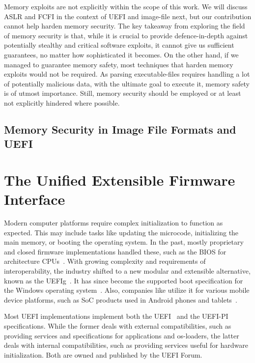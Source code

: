 Memory exploits are not explicitly within the scope of this work. We will discuss \gls{ASLR} and \gls{FCFI} in the context of \gls{UEFI} and \gls{image-file} next, but our contribution cannot help harden memory security. The key takeaway from exploring the field of memory security is that, while it is crucial to provide defence-in-depth against potentially stealthy and critical software exploits, it cannot give us sufficient guarantees, no matter how sophisticated it becomes. On the other hand, if we managed to guarantee memory safety, most techniques that harden memory exploits would not be required. As parsing \glspl{executable-file} requires handling a lot of potentially malicious data, with the ultimate goal to execute it, memory safety is of utmost importance. Still, memory security should be employed or at least not explicitly hindered where possible.

\subsection{Memory Security in Image File Formats and UEFI}

\section{The Unified Extensible Firmware Interface}

Modern computer platforms require complex initialization to function as expected. This may include tasks like updating the  \gls{microcode}, initializing the main memory, or booting the operating system. In the past, mostly proprietary and closed \gls{firmware} implementations handled these, such as the \gls{BIOS} for  architecture \glspl{CPU}~\cite{bios-spec}. With growing complexity and requirements of interoperability, the industry shifted to a new modular and extensible alternative, known as the \gls{UEFIg}~\cite{uefi-spec}. It has since become the supported boot specification for the  Windows operating system~\cite{win10-hwreq}. Also, companies like  utilize it for various mobile device platforms, such as \gls{SoC} products used in Android phones and tablets~\cite{qc-uefi}.

Most \gls{UEFI} implementations implement both the \gls{UEFI}~\cite{uefi-spec} and the \gls{UEFI-PI}~\cite{pi-spec} specifications. While the former deals with external compatibilities, such as providing services and specifications for applications and \glspl{os-loader}, the latter deals with internal compatibilities, such as providing services useful for hardware initialization. Both are owned and published by the \gls{UEFI} Forum.

